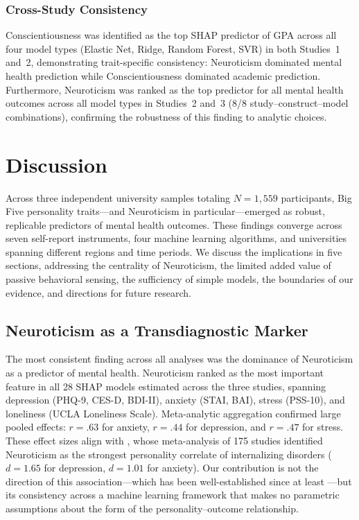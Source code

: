 \documentclass[12pt, a4paper]{article}
\begin{document}
\subsubsection{Cross-Study Consistency}

Conscientiousness was identified as the top SHAP predictor of GPA across all four model types (Elastic Net, Ridge, Random Forest, SVR) in both Studies~1 and~2, demonstrating trait-specific consistency: Neuroticism dominated mental health prediction while Conscientiousness dominated academic prediction. Furthermore, Neuroticism was ranked as the top predictor for all mental health outcomes across all model types in Studies~2 and~3 (8/8 study--construct--model combinations), confirming the robustness of this finding to analytic choices.

\section{Discussion}

Across three independent university samples totaling $N = 1{,}559$ participants, Big Five personality traits---and Neuroticism in particular---emerged as robust, replicable predictors of mental health outcomes. These findings converge across seven self-report instruments, four machine learning algorithms, and universities spanning different regions and time periods. We discuss the implications in five sections, addressing the centrality of Neuroticism, the limited added value of passive behavioral sensing, the sufficiency of simple models, the boundaries of our evidence, and directions for future research.

\subsection{Neuroticism as a Transdiagnostic Marker}

The most consistent finding across all analyses was the dominance of Neuroticism as a predictor of mental health. Neuroticism ranked as the most important feature in all 28 SHAP models estimated across the three studies, spanning depression (PHQ-9, CES-D, BDI-II), anxiety (STAI, BAI), stress (PSS-10), and loneliness (UCLA Loneliness Scale). Meta-analytic aggregation confirmed large pooled effects: $r = .63$ for anxiety, $r = .44$ for depression, and $r = .47$ for stress. These effect sizes align with \citet{kotov2010linking}, whose meta-analysis of 175 studies identified Neuroticism as the strongest personality correlate of internalizing disorders ($d = 1.65$ for depression, $d = 1.01$ for anxiety). Our contribution is not the direction of this association---which has been well-established since at least \citet{costa1987neuroticism}---but its consistency across a machine learning framework that makes no parametric assumptions about the form of the personality--outcome relationship.
\end{document}
